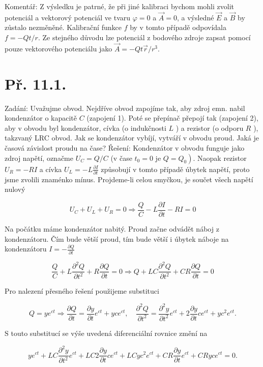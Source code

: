 \documentclass[czech,11pt,a4paper]{article}
\begin{document}
Komentář: Z výsledku je patrné, že při jiné kalibraci bychom mohli zvolit potenciál a vektorový potenciál ve tvaru $\varphi=0$ a $\vec{A}=0$, a výsledné $\vec{E}$ a $\vec{B}$ by zůstalo nezměněné. Kalibrační funkce $f$ by v tomto případě odpovídala $f=-Q t / r$. Ze stejného důvodu lze potenciál z bodového zdroje zapsat pomocí pouze vektorového potenciálu jako $\vec{A}=-Q t \vec{r} / r^{3}$.

\section{Př. 11.1.}
Zadání: Uvažujme obvod. Nejdříve obvod zapojíme tak, aby zdroj emn. nabil kondenzátor o kapacitě $C$ (zapojení 1). Poté se přepínač přepojí tak (zapojení 2), aby v obvodu byl kondenzátor, cívka (o indukčnosti $L$ ) a rezistor (o odporu $R$ ), takzvaný LRC obvod. Jak se kondenzátor vybíjí, vytváří v obvodu proud. Jaká je časová závislost proudu na čase?
Řešení: Kondenzátor v obvodu funguje jako zdroj napětí, označme $U_{C}=Q / C$ (v čase $t_{0}=0$ je $\left.Q=Q_{0}\right)$. Naopak rezistor $U_{R}=-R I$ a cívka $U_{L}=-L \frac{\partial I}{\partial t}$ způsobují v tomto případě úbytek napětí, proto jsme zvolili znaménko mínus. Projdeme-li celou smyčkou, je součet všech napětí nulový

$$
U_{C}+U_{L}+U_{R}=0 \Rightarrow \frac{Q}{C}-L \frac{\partial I}{\partial t}-R I=0
$$

Na počátku máme kondenzátor nabitý. Proud začne odvádět náboj z kondenzátoru. Čím bude větší proud, tím bude větší i úbytek náboje na kondenzátoru $I=-\frac{\partial Q}{\partial t}$

$$
\frac{Q}{C}+L \frac{\partial^{2} Q}{\partial t^{2}}+R \frac{\partial Q}{\partial t}=0 \Rightarrow Q+L C \frac{\partial^{2} Q}{\partial t^{2}}+C R \frac{\partial Q}{\partial t}=0
$$

Pro nalezení přesného řešení použijeme substituci

$$
Q=y e^{c t} \Rightarrow \frac{\partial Q}{\partial t}=\frac{\partial y}{\partial t} e^{c t}+y c e^{c t}, \quad \frac{\partial^{2} Q}{\partial t^{2}}=\frac{\partial^{2} y}{\partial t^{2}} e^{c t}+2 \frac{\partial y}{\partial t} c e^{c t}+y c^{2} e^{c t} .
$$

$\mathrm{S}$ touto substitucí se výše uvedená diferenciální rovnice změní na

$$
y e^{c t}+L C \frac{\partial^{2} y}{\partial t^{2}} e^{c t}+L C 2 \frac{\partial y}{\partial t} c e^{c t}+L C y c^{2} e^{c t}+C R \frac{\partial y}{\partial t} e^{c t}+C R y c e^{c t}=0 .
$$
\end{document}
